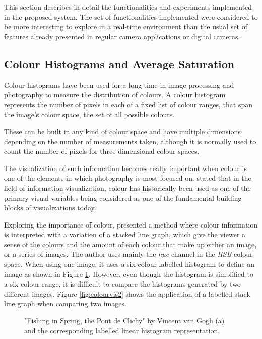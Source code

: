 This section describes in detail the functionalities and experiments implemented in the proposed system. The set of functionalities implemented were considered to be more interesting to explore in a real-time environment than the usual set of features already presented in regular camera applications or digital cameras.

\subsection{Colour Histograms and Average Saturation}
\label{sub:histograms}

Colour histograms have been used for a long time in image processing and photography to measure the distribution of colours. A colour histogram represents the number of pixels in each of a fixed list of colour ranges, that span the image's colour space, the set of all possible colours.

These can be built in any kind of colour space and have multiple dimensions depending on the number of measurements taken, although it is normally used to count the number of pixels for three-dimensional colour spaces.

The visualization of such information becomes really important when colour is one of the elements in which photography is most focused on. \citeauthor{bertin1983semiology} \cite{bertin1983semiology} stated that in the field of information visualization, colour has historically been used as one of the primary visual variables being considered as one of the fundamental building blocks of visualizations today.

Exploring the importance of colour,  \citeauthor{haber2011colourvis} \cite{haber2011colourvis} presented a method where colour information is interpreted with a variation of a stacked line graph, which give the viewer a sense of the colours and the amount of each colour that make up either an image, or a series of images. The author uses mainly the \emph{hue} channel in the \emph{HSB} colour space. When using one image, it uses a six-colour labelled histogram to define an image as shown in Figure \ref{fig:colourvis1}. However, even though the histogram is simplified to a six colour range, it is difficult to compare the histograms generated by two different images. Figure \ref{fig:colourvis2} shows the application of a labelled stack line graph when comparing two images.

\begin{figure}[htbp]
	\centering
  \caption{"Fishing in Spring, the Pont de Clichy" by Vincent van Gogh (a) and the corresponding labelled linear histogram representation.}
  \label{fig:colourvis1}
\end{figure}


